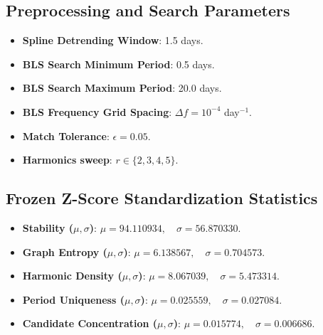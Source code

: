 \subsection{Preprocessing and Search Parameters} \label{sec:app_preproc_params}
\begin{itemize}
\item \textbf{Spline Detrending Window}: 1.5 days.
\item \textbf{BLS Search Minimum Period}: 0.5 days.
\item \textbf{BLS Search Maximum Period}: 20.0 days.
\item \textbf{BLS Frequency Grid Spacing}: $\Delta f = 10^{-4}$ day$^{-1}$.
\item \textbf{Match Tolerance}: $\epsilon = 0.05$.
\item \textbf{Harmonics sweep}: $r \in \{2, 3, 4, 5\}$.
\end{itemize}

\subsection{Frozen Z-Score Standardization Statistics} \label{sec:app_frozen_stats}
\begin{itemize}
\item \textbf{Stability ($\mu, \sigma$)}: $\mu = 94.110934, \quad \sigma = 56.870330$.
\item \textbf{Graph Entropy ($\mu, \sigma$)}: $\mu = 6.138567, \quad \sigma = 0.704573$.
\item \textbf{Harmonic Density ($\mu, \sigma$)}: $\mu = 8.067039, \quad \sigma = 5.473314$.
\item \textbf{Period Uniqueness ($\mu, \sigma$)}: $\mu = 0.025559, \quad \sigma = 0.027084$.
\item \textbf{Candidate Concentration ($\mu, \sigma$)}: $\mu = 0.015774, \quad \sigma = 0.006686$.
\end{itemize}

